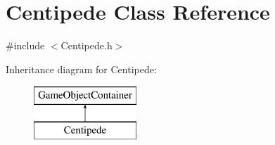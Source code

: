 \hypertarget{class_centipede}{}\section{Centipede Class Reference}
\label{class_centipede}


{\ttfamily \#include $<$Centipede.\+h$>$}

Inheritance diagram for Centipede\+:\begin{figure}[H]
\begin{center}
\leavevmode
\includegraphics[height=2.000000cm]{class_centipede}
\end{center}
\end{figure}
